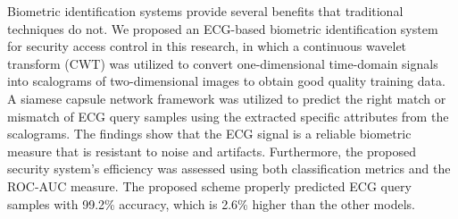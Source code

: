\documentclass{standalone}
\begin{document}
Biometric identification systems provide several benefits that traditional techniques do not. We proposed an ECG-based biometric identification system for security access control in this research, in which a continuous wavelet transform (CWT) was utilized to convert one-dimensional time-domain signals into scalograms of two-dimensional images to obtain good quality training data. A siamese capsule network framework was utilized to predict the right match or mismatch of ECG query samples using the extracted specific attributes from the scalograms. The findings show that the ECG signal is a reliable biometric measure that is resistant to noise and artifacts. Furthermore, the proposed security system's efficiency was assessed using both classification metrics and the ROC-AUC measure. The proposed scheme properly predicted ECG query samples with 99.2\% accuracy, which is 2.6\% higher than the other models.


\end{document}
